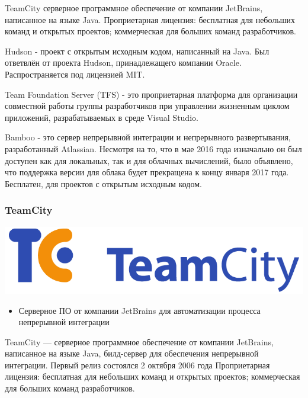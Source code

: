 \documentclass{../industrial-development}
\begin{document}
TeamCity серверное программное обеспечение от компании JetBrains, написанное на языке Java. Проприетарная лицензия: бесплатная для небольших команд и открытых проектов; коммерческая для больших команд разработчиков.

Hudson - проект с открытым исходным кодом, написанный на Java. Был ответвлён от проекта Hudson, принадлежащего компании Oracle. Распространяется под лицензией MIT.

Team Foundation Server (TFS) - это проприетарная платформа для организации совместной работы группы разработчиков при управлении жизненным циклом приложений, разрабатываемых в среде Visual Studio.

Bamboo - это сервер непрерывной интеграции и непрерывного развертывания, разработанный Atlassian. Несмотря на то, что в мае 2016 года изначально он был доступен как для локальных, так и для облачных вычислений, было объявлено, что поддержка версии для облака будет прекращена к концу января 2017 года. Бесплатен, для проектов с открытым исходным кодом.

\begin{frame} \frametitle{TeamCity}
	\includegraphics[width=\textwidth]{teamcity}
	\begin{block}{}
		\begin{itemize}
			\item Серверное ПО от компании JetBrains для автоматизации процесса непрерывной интеграции
		\end{itemize}
	\end{block}
\end{frame}
\lecturenotes
TeamCity — серверное программное обеспечение от компании JetBrains, написанное на языке Java, билд-сервер для обеспечения непрерывной интеграции. Первый релиз состоялся 2 октября 2006 года
Проприетарная лицензия: бесплатная для небольших команд и открытых проектов; коммерческая для больших команд разработчиков.
\end{document}

